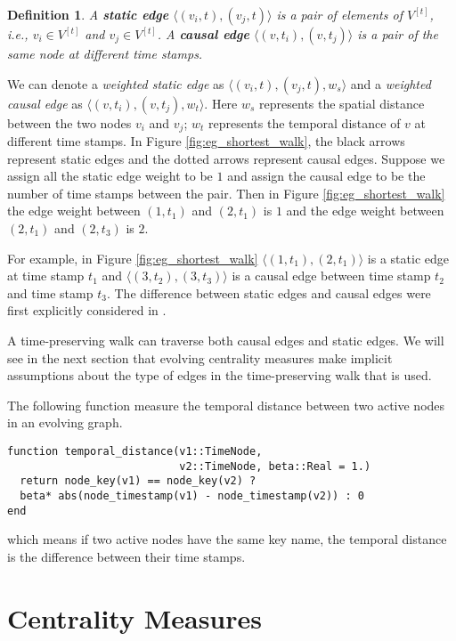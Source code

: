 \documentclass[12pt]{article}
\newtheorem{definition}{Definition}
\theoremstyle{definition}
\begin{document}
\begin{definition}
A \textbf{static edge} $\langle (v_i, t), (v_j, t)\rangle$ is a pair of elements of $V^{[t]}$, i.e., $v_i \in V^{[t]}$ and
$v_j \in V^{[t]}$.
 A \textbf{causal edge} $\langle (v, t_i), (v, t_j)\rangle$ is a pair of the same node at different time stamps.
\end{definition}

We can denote a \emph{weighted static edge} as $\langle (v_i, t), (v_j, t), w_s \rangle$ and a \emph{weighted causal edge} as $\langle (v, t_i), (v, t_j), w_t \rangle$.
Here $w_s$ represents the spatial distance between the two nodes $v_i$ and $v_j$; $w_t$ represents the
temporal distance of $v$ at different time stamps.
In Figure \ref{fig:eg_shortest_walk}, the black arrows represent static edges and the dotted arrows represent causal edges.
Suppose we assign all the static edge weight to be $1$ and
assign the causal edge to be the number of time stamps between the pair. Then in Figure \ref{fig:eg_shortest_walk}
the edge weight between $(1, t_1)$ and $(2, t_1)$ is $1$ and the edge weight between $(2, t_1)$ and $(2, t_3)$
 is $2$.

 For example, in Figure \ref{fig:eg_shortest_walk}
 $\langle (1, t_1), (2, t_1) \rangle$ is a static edge at time stamp $t_1$ and $\langle (3, t_2), (3, t_3) \rangle$ is a causal edge between time stamp $t_2$ and time stamp $t_3$.
 The difference between static edges and causal edges were first explicitly considered in \cite{chen16}.

A time-preserving walk can traverse both causal edges and static edges.
We will see in the next section that evolving centrality measures make implicit assumptions about the type of edges in the
time-preserving walk that is used.

The following function measure the temporal distance between two active nodes in an evolving graph.

\begin{lstlisting}
function temporal_distance(v1::TimeNode,
                           v2::TimeNode, beta::Real = 1.)
  return node_key(v1) == node_key(v2) ?
  beta* abs(node_timestamp(v1) - node_timestamp(v2)) : 0
end
\end{lstlisting}
which means if two active nodes have the same key name, the temporal distance is the difference between their time stamps.

\section{Centrality Measures}
\label{sec:topol-temp-flow}
\end{document}
